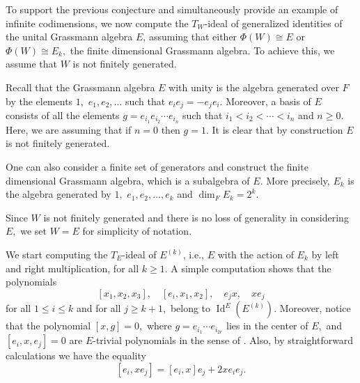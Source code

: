 \documentclass[reqno]{amsart}
\theoremstyle{definition}
\numberwithin{equation}{section}
\numberwithin{theorem}{section}
\DeclareMathOperator{\I}{Id}
\begin{document}
To support the previous conjecture and simultaneously provide an example of infinite codimensions, we now compute the $T_W$-ideal of generalized identities of the unital Grassmann algebra $E$, assuming that either $\Phi(W)\cong E$ or $\Phi(W)\cong E_k,$ the finite dimensional Grassmann algebra.
To achieve this, we assume that $W$ is not finitely generated. 

Recall that the Grassmann algebra $E$ with unity is the algebra generated over $F$ by the elements $1,$ $e_1,e_2,\ldots$ such that $e_ie_j=-e_je_i.$ Moreover, a basis of $E$ consists of all the elements $g =e_{i_1}e_{i_2}\cdots e_{i_n}$ such that $i_1<i_2<\cdots<i_n$ and $n\geq 0.$ Here, we are assuming that if $n=0$ then $g=1.$ It is clear that by construction $E$ is not finitely generated.


One can also consider a finite set of generators and construct the finite dimensional Grassmann algebra, which is a subalgebra of $E.$ More precisely, $E_k$ is the algebra generated by $1,$ $e_1,e_2,\ldots , e_k$ and $\dim_F E_k= 2^k.$


Since $W$ is not finitely generated and there is no loss of generality in considering $E,$ we set $W=E$ for simplicity of notation. 




We start computing the $T_E$-ideal of $E^{(k)}$, i.e., $E$ with the action of $E_k$ by left and right multiplication, for all $k\geq 1.$
A simple computation shows that the polynomials 
\begin{equation}\label{generatoridigrassmann}
    [x_1,x_2,x_3], \quad [e_i,x_1,x_2], \quad e_jx, \quad xe_j
\end{equation}
for all $1\leq i\leq k$ and for all $j\geq k+1,$ belong to $\I^E(E^{(k)}).$ Moreover, notice that the polynomial $[x,g]=0,$ where $g = e_{i_1}\cdots e_{i_{2r}}$ lies in the center of $E,$ and $[e_i,x,e_j]=0$ are $E$-trivial polynomials in the sense of \cite[Corollary 2.3]{MartinoRizzo2024}.
Also, by straightforward calculations we have the equality
\begin{equation}\label{unpolinomiotrivialedigrassmann}
    [e_i,xe_j] = [e_i,x]e_j+2xe_ie_j.
\end{equation}
\end{document}
